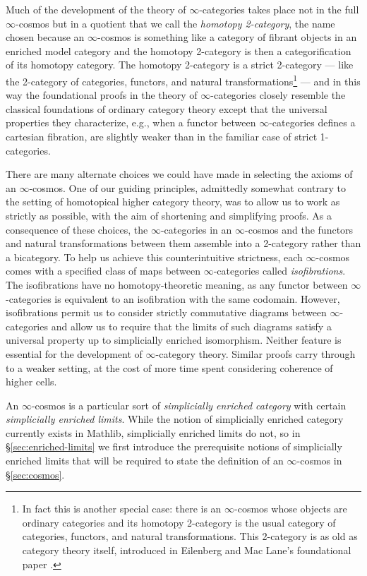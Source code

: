  Much of the development of the theory of $\infty$-categories takes place not in the full $\infty$-cosmos but in a quotient that we call the \emph{homotopy 2-category}, the name chosen because an $\infty$-cosmos is something like a category of fibrant objects in an enriched model category and the homotopy 2-category is then a categorification of its homotopy category. The homotopy 2-category is a strict 2-category --- like the 2-category of categories, functors, and natural transformations\footnote{In fact this is another special case: there is an \texorpdfstring{$\infty$}{infinity}-cosmos whose objects are ordinary categories and its homotopy 2-category is the usual category of categories, functors, and natural transformations. This 2-category is as old as category theory itself, introduced in Eilenberg and Mac Lane's foundational paper \cite{EilenbergMaclane:1945gt}.} --- and in this way the foundational proofs in the theory of $\infty$-categories closely resemble the classical foundations of ordinary category theory except that the universal properties they characterize, e.g., when a functor between $\infty$-categories defines a cartesian fibration, are slightly weaker than in the familiar case of strict 1-categories.

 There are many alternate choices we could have made in selecting the axioms of an $\infty$-cosmos. One of our guiding principles, admittedly somewhat contrary to the setting of homotopical higher category theory, was to allow us to work as strictly as possible, with the aim of shortening and simplifying proofs. As a consequence of these choices, the $\infty$-categories in an $\infty$-cosmos and the functors and natural transformations between them assemble into a 2-category rather than a bicategory. To help us achieve this counterintuitive strictness, each $\infty$-cosmos comes with a specified class of maps between $\infty$-categories called \emph{isofibrations}. The isofibrations have no homotopy-theoretic meaning, as any functor between $\infty$-categories is equivalent to an isofibration with the same codomain. However, isofibrations permit us to consider strictly commutative diagrams between $\infty$-cat\-e\-go\-ries and allow us to require that the limits of such diagrams satisfy a universal property up to simplicially enriched isomorphism. Neither feature is essential for the development of $\infty$-category theory. Similar proofs carry through to a weaker setting, at the cost of more time spent considering coherence of higher cells.

 An $\infty$-cosmos is a particular sort of \emph{simplicially enriched category} with certain \emph{simplicially enriched limits}. While the notion of simplicially enriched category currently exists in Mathlib, simplicially enriched limits do not, so in \S\ref{sec:enriched-limits} we first introduce the prerequisite notions of simplicially enriched limits that will be required to state the definition of an $\infty$-cosmos in \S\ref{sec:cosmos}.


